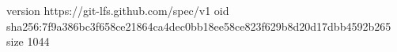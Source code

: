 version https://git-lfs.github.com/spec/v1
oid sha256:7f9a386bc3f658ce21864ca4dec0bb18ee58ce823f629b8d20d17dbb4592b265
size 1044
